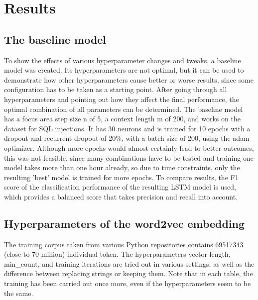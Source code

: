 \documentclass[
	a4paper,
	pagesize,
	pdftex,
	12pt,
	twoside, %
	BCOR=5mm, %
	ngerman,
	fleqn,
	final,
	]{scrartcl}
\begin{document}
\newpage

\section{Results}\label{Results}

\subsection{The baseline model}
To show the effects of various hyperparameter changes and tweaks, a baseline model was created. Its hyperparameters are not optimal, but it can be used to demonstrate how other hyperparameters cause better or worse results, since some configuration has to be taken as a starting point. After going through all hyperparameters and pointing out how they affect the final performance, the optimal combination of all parameters can be determined. The baseline model has a focus area step size n of 5, a context length m of 200, and works on the dataset for SQL injections. It has 30 neurons and is trained for 10 epochs with a dropout and recurrent dropout of 20\%, with a batch size of 200, using the adam optimizer. Although more epochs would almost certainly lead to better outcomes, this was not feasible, since many combinations have to be tested and training one model takes more than one hour already, so due to time constraints, only the resulting 'best' model is trained for more epochs. To compare results, the F1 score of the classification performance of the resulting LSTM  model is used, which provides a balanced score that takes precision and recall into account.

\subsection{Hyperparameters of the word2vec embedding}

The training corpus taken from various Python repositories contains 69517343 (close to 70 million) individual token. The hyperparameters vector length, min\_count, and training iterations are tried out in various settings, as well as the difference between replacing strings or keeping them. Note that in each table, the training has been carried out once more, even if the hyperparameters seem to be the same.
\end{document}
